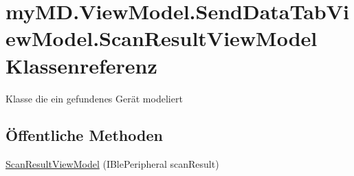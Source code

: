 \hypertarget{classmy_m_d_1_1_view_model_1_1_send_data_tab_view_model_1_1_scan_result_view_model}{}\section{my\+M\+D.\+View\+Model.\+Send\+Data\+Tab\+View\+Model.\+Scan\+Result\+View\+Model Klassenreferenz}
\label{classmy_m_d_1_1_view_model_1_1_send_data_tab_view_model_1_1_scan_result_view_model}


Klasse die ein gefundenes Gerät modeliert  


\subsection*{Öffentliche Methoden}
\begin{DoxyCompactItemize}
\item 
\mbox{\hyperlink{classmy_m_d_1_1_view_model_1_1_send_data_tab_view_model_1_1_scan_result_view_model_a9e78899bcb0d00b169ab62b5fcc115d7}{Scan\+Result\+View\+Model}} (I\+Ble\+Peripheral scan\+Result)
\end{DoxyCompactItemize}
